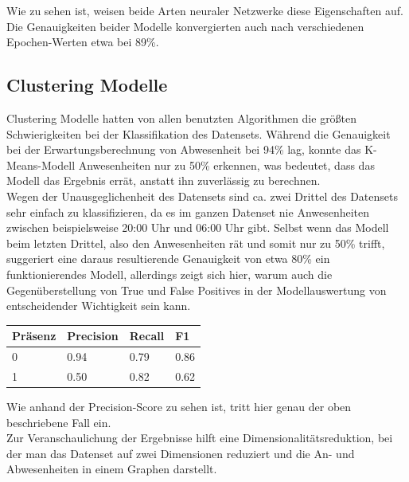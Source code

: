 Wie zu sehen ist, weisen beide Arten neuraler Netzwerke diese Eigenschaften auf. Die Genauigkeiten beider Modelle
konvergierten auch nach verschiedenen Epochen-Werten etwa bei 89\%.

\subsection{Clustering Modelle}
Clustering Modelle hatten von allen benutzten Algorithmen die größten Schwierigkeiten bei der Klassifikation
des Datensets. Während die Genauigkeit bei der Erwartungsberechnung von Abwesenheit bei 94\% lag, konnte das
K-Means-Modell Anwesenheiten nur zu 50\% erkennen, was bedeutet, dass das Modell das Ergebnis errät, anstatt
ihn zuverlässig zu berechnen. \\
Wegen der Unausgeglichenheit des Datensets sind ca. zwei Drittel des Datensets sehr einfach zu 
klassifizieren, da es im ganzen Datenset nie Anwesenheiten zwischen beispielsweise 20:00 Uhr und 06:00 Uhr 
gibt. Selbst wenn das Modell beim letzten Drittel, also den Anwesenheiten rät und somit nur
zu 50\% trifft, suggeriert eine daraus resultierende Genauigkeit von etwa 80\% ein funktionierendes Modell,
allerdings zeigt sich hier, warum auch die Gegenüberstellung von True und False Positives in der 
Modellauswertung von entscheidender Wichtigkeit sein kann.\\

\begin{center}
    \begin{tabular}{|p{1.5cm}||p{1.8cm}|p{1.5cm}|p{1.5cm}|}
        \hline
        \hfill Präsenz&\hfill Precision &\hfill Recall &\hfill F1\\
        \hline
        \hline
        \hfill 0&\hfill 0.94&\hfill 0.79&\hfill 0.86\\
        \hfill 1&\hfill 0.50&\hfill 0.82&\hfill 0.62\\
        \hline
    \end{tabular}          
\end{center}

Wie anhand der Precision-Score zu sehen ist, tritt hier genau der oben beschriebene Fall ein.\\
Zur Veranschaulichung der Ergebnisse hilft eine Dimensionalitätsreduktion, bei der man das Datenset auf zwei
Dimensionen reduziert und die An- und Abwesenheiten in einem Graphen darstellt.

